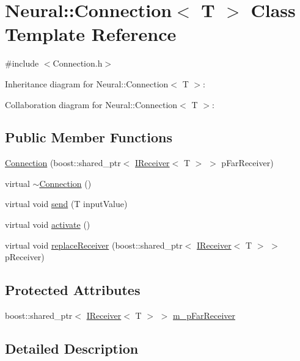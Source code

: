 \hypertarget{class_neural_1_1_connection}{
\section{Neural::Connection$<$ T $>$ Class Template Reference}
\label{class_neural_1_1_connection}
}


{\ttfamily \#include $<$Connection.h$>$}



Inheritance diagram for Neural::Connection$<$ T $>$:


Collaboration diagram for Neural::Connection$<$ T $>$:
\subsection*{Public Member Functions}
\begin{DoxyCompactItemize}
\item 
\hyperlink{class_neural_1_1_connection_ade932c13cf5868ef6e16f2c189b894e7}{Connection} (boost::shared\_\-ptr$<$ \hyperlink{class_neural_1_1_i_receiver}{IReceiver}$<$ T $>$ $>$ pFarReceiver)
\item 
virtual \hyperlink{class_neural_1_1_connection_a334f870cff147a4ac90234072d7d42d6}{$\sim$Connection} ()
\item 
virtual void \hyperlink{class_neural_1_1_connection_a7bbebdc1dc04739efe9debaaae1fb9b3}{send} (T inputValue)
\item 
virtual void \hyperlink{class_neural_1_1_connection_a17ae36edba84a916f2f326699b5bc9c5}{activate} ()
\item 
virtual void \hyperlink{class_neural_1_1_connection_a104f60ab7897e1198b85c11b66295c79}{replaceReceiver} (boost::shared\_\-ptr$<$ \hyperlink{class_neural_1_1_i_receiver}{IReceiver}$<$ T $>$ $>$ pReceiver)
\end{DoxyCompactItemize}
\subsection*{Protected Attributes}
\begin{DoxyCompactItemize}
\item 
boost::shared\_\-ptr$<$ \hyperlink{class_neural_1_1_i_receiver}{IReceiver}$<$ T $>$ $>$ \hyperlink{class_neural_1_1_connection_aeeb9c2063e63ff374ce39178f59f9170}{m\_\-pFarReceiver}
\end{DoxyCompactItemize}


\subsection{Detailed Description}

